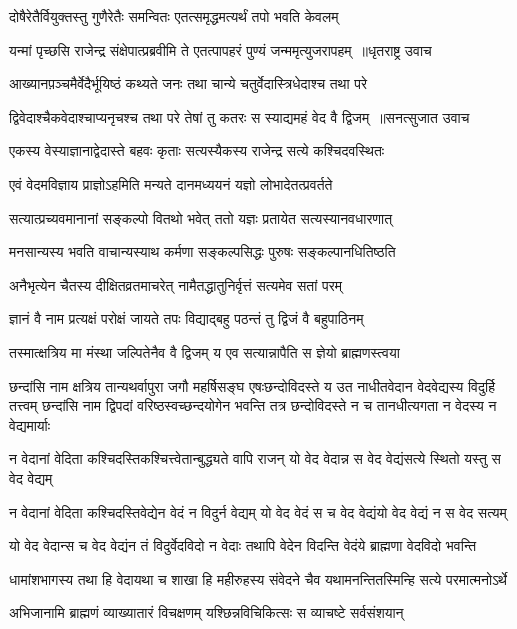 \twolineshloka
{दोषैरेतैर्वियुक्तस्तु गुणैरेतैः समन्वितः}
{एतत्समृद्धमत्यर्थं तपो भवति केवलम्}


\threelineshloka
{यन्मां पृच्छसि राजेन्द्र संक्षेपात्प्रब्रवीमि ते}
{एतत्पापहरं पुण्यं जन्ममृत्युजरापहम् ॥धृतराष्ट्र उवाच}
{}


\twolineshloka
{आख्यानप़ञ्चमैर्वेदैर्भूयिष्ठं कथ्यते जनः}
{तथा चान्ये चतुर्वेदास्त्रिधेदाश्च तथा परे}


\threelineshloka
{द्विवेदाश्चैकवेदाश्चाप्यनृचश्च तथा परे}
{तेषां तु कतरः स स्याद्यमहं वेद वै द्विजम् ॥सनत्सुजात उवाच}
{}


\twolineshloka
{एकस्य वेस्याज्ञानाद्वेदास्ते बहवः कृताः}
{सत्यस्यैकस्य राजेन्द्र सत्ये कश्चिदवस्थितः}


\twolineshloka
{एवं वेदमविज्ञाय प्राज्ञोऽहमिति मन्यते}
{दानमध्ययनं यज्ञो लोभादेतत्प्रवर्तते}


\twolineshloka
{सत्यात्प्रच्यवमानानां सङ्कल्पो वितथो भवेत्}
{ततो यज्ञः प्रतायेत सत्यस्यानवधारणात्}


\twolineshloka
{मनसान्यस्य भवति वाचान्यस्याथ कर्मणा}
{सङ्कल्पसिद्धः पुरुषः सङ्कल्पानधितिष्ठति}


\twolineshloka
{अनैभृत्येन चैतस्य दीक्षितव्रतमाचरेत्}
{नामैतद्धातुनिर्वृत्तं सत्यमेव सतां परम्}


\twolineshloka
{ज्ञानं वै नाम प्रत्यक्षं परोक्षं जायते तपः}
{विद्याद्बहु पठन्तं तु द्विजं वै बहुपाठिनम्}


\twolineshloka
{तस्मात्क्षत्रिय मा मंस्था जल्पितेनैव वै द्विजम्}
{य एव सत्यान्नापैति स ज्ञेयो ब्राह्मणस्त्वया}


छन्दांसि नाम क्षत्रिय तान्यथर्वापुरा जगौ महर्षिसङ्घ एषःछन्दोविदस्ते य उत नाधीतवेदान वेदवेद्यस्य विदुर्हि तत्त्वम्
\twolineshloka
{छन्दांसि नाम द्विपदां वरिष्ठस्वच्छन्दयोगेन भवन्ति तत्र}
{छन्दोविदस्ते न च तानधीत्यगता न वेदस्य न वेद्यमार्याः}


\twolineshloka
{न वेदानां वेदिता कश्चिदस्तिकश्चित्त्वेतान्बुद्ध्यते वापि राजन्}
{यो वेद वेदान्न स वेद वेद्यंसत्ये स्थितो यस्तु स वेद वेद्यम्}


\twolineshloka
{न वेदानां वेदिता कश्चिदस्तिवेद्येन वेदं न विदुर्न वेद्यम्}
{यो वेद वेदं स च वेद वेद्यंयो वेद वेद्यं न स वेद सत्यम्}


\twolineshloka
{यो वेद वेदान्स च वेद वेद्यंन तं विदुर्वेदविदो न वेदाः}
{तथापि वेदेन विदन्ति वेदंये ब्राह्मणा वेदविदो भवन्ति}


\twolineshloka
{धामांशभागस्य तथा हि वेदायथा च शाखा हि महीरुहस्य}
{संवेदने चैव यथामनन्तितस्मिन्हि सत्ये परमात्मनोऽर्थे}


\twolineshloka
{अभिजानामि ब्राह्मणं व्याख्यातारं विचक्षणम्}
{यश्छिन्नविचिकित्सः स व्याचष्टे सर्वसंशयान्}


